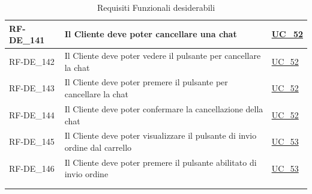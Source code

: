 \begin{longtable}{|>{\raggedright}p{}|>{\raggedright\arraybackslash}p{}|>{\raggedright\arraybackslash}p{}|}
	\hline
	RF-DE\_141 \hypertarget{rf-de_139} & Il Cliente deve poter cancellare una chat & \hyperref[uc_52]{UC\_52} \\
	\hline
	RF-DE\_142 \hypertarget{rf-de_140} & Il Cliente deve poter vedere il pulsante per cancellare la chat & \hyperref[uc_52]{UC\_52} \\
	\hline
	RF-DE\_143 \hypertarget{rf-de_141} & Il Cliente deve poter premere il pulsante per cancellare la chat & \hyperref[uc_52]{UC\_52} \\
	\hline
	RF-DE\_144 \hypertarget{rf-de_142} & Il Cliente deve poter confermare la cancellazione della chat & \hyperref[uc_52]{UC\_52} \\
	\hline
	RF-DE\_145 \hypertarget{rf-de_143} & Il Cliente deve poter visualizzare il pulsante di invio ordine dal carrello & \hyperref[uc_53]{UC\_53} \\
	\hline
	RF-DE\_146 \hypertarget{rf-de_144} & Il Cliente deve poter premere il pulsante abilitato di invio ordine & \hyperref[uc_53]{UC\_53} \\
	\hline
	\multicolumn{3}{c}{} \\
	\caption{Requisiti Funzionali desiderabili}\hypertarget{tab:funzionali_desiderabili}\\
\end{longtable}

	
